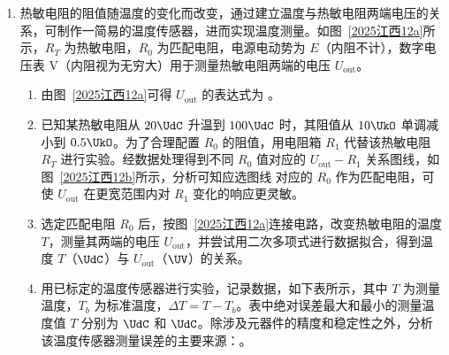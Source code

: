 \documentclass[\gkver]{gaokaozhenti}
\begin{document}
\begin{enumerate}
{\begin{enumerate}
故在误差范围内 $\Delta v^{2} = 2gH_{L}$ 成立，说明下滑过程中滑块的动能增加量等于重力势能的减少量，即机械能守恒。
\end{enumerate}
}

\item
热敏电阻的阻值随温度的变化而改变，通过建立温度与热敏电阻两端电压的关系，可制作一简易的温度传感器，进而实现温度测量。如图~\ref{2025江西12a}所示，$R_{T}$ 为热敏电阻，$R_{0}$ 为匹配电阻，电源电动势为 $E$（内阻不计），数字电压表 V（内阻视为无穷大）用于测量热敏电阻两端的电压 $U_{\text{out}}$。

\begin{enumerate}
\item
由图~\ref{2025江西12a}可得 $U_{\text{out}}$ 的表达式为 。
\item
已知某热敏电阻从 $20 \UdC$ 升温到 $100 \UdC$ 时，其阻值从 $10 \UkO$ 单调减小到 $0.5 \UkO$。为了合理配置 $R_{0}$ 的阻值，用电阻箱 $R_{1}$ 代替该热敏电阻 $R_{T}$ 进行实验。经数据处理得到不同 $R_{0}$ 值对应的 $U_{\text{out}}-R_{1}$ 关系图线，如图~\ref{2025江西12b}所示，分析可知应选图线  对应的 $R_{0}$ 作为匹配电阻，可使 $U_{\text{out}}$ 在更宽范围内对 $R_{1}$ 变化的响应更灵敏。
\item
选定匹配电阻 $R_{0}$ 后，按图~\ref{2025江西12a}连接电路，改变热敏电阻的温度 $T$，测量其两端的电压 $U_{\text{out}}$，并尝试用二次多项式进行数据拟合，得到温度 $T$（$\UdC$）与 $U_{\text{out}}$（$\UV$）的关系。
\item
用已标定的温度传感器进行实验，记录数据，如下表所示，其中 $T$ 为测量温度，$T_{b}$ 为标准温度，$\Delta T = T - T_{b}$。表中绝对误差最大和最小的测量温度值 $T$ 分别为  $\UdC$ 和  $\UdC$。除涉及元器件的精度和稳定性之外，分析该温度传感器测量误差的主要来源：。
\end{enumerate}


\end{enumerate}
\end{document}
